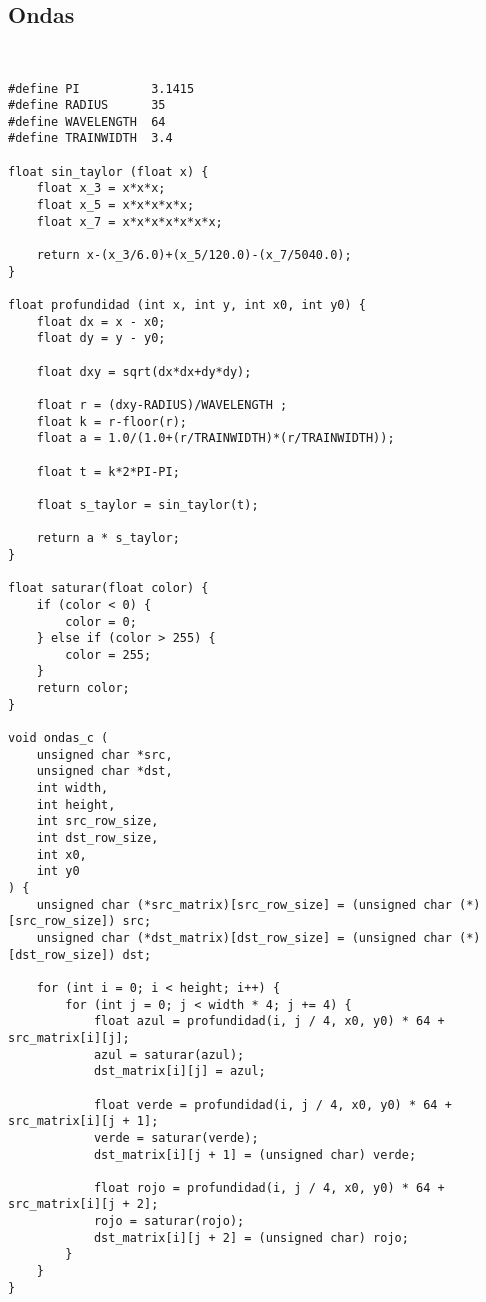 \subsection{Ondas}

\begin{codesnippet}
\begin{verbatim}


#define PI 			3.1415
#define RADIUS 		35
#define WAVELENGTH 	64
#define TRAINWIDTH 	3.4

float sin_taylor (float x) {
    float x_3 = x*x*x;
    float x_5 = x*x*x*x*x;
    float x_7 = x*x*x*x*x*x*x;

    return x-(x_3/6.0)+(x_5/120.0)-(x_7/5040.0);
}

float profundidad (int x, int y, int x0, int y0) {
    float dx = x - x0;
    float dy = y - y0;

    float dxy = sqrt(dx*dx+dy*dy);

    float r = (dxy-RADIUS)/WAVELENGTH ;
    float k = r-floor(r);
    float a = 1.0/(1.0+(r/TRAINWIDTH)*(r/TRAINWIDTH));

    float t = k*2*PI-PI;

    float s_taylor = sin_taylor(t);

    return a * s_taylor;
}

float saturar(float color) {
    if (color < 0) {
        color = 0;
    } else if (color > 255) {
        color = 255;
    }
    return color;
}

void ondas_c (
	unsigned char *src,
	unsigned char *dst,
	int width,
	int height,
	int src_row_size,
	int dst_row_size,
	int x0,
	int y0
) {
    unsigned char (*src_matrix)[src_row_size] = (unsigned char (*)[src_row_size]) src;
    unsigned char (*dst_matrix)[dst_row_size] = (unsigned char (*)[dst_row_size]) dst;

    for (int i = 0; i < height; i++) {
        for (int j = 0; j < width * 4; j += 4) {
            float azul = profundidad(i, j / 4, x0, y0) * 64 + src_matrix[i][j];
            azul = saturar(azul);
            dst_matrix[i][j] = azul;

            float verde = profundidad(i, j / 4, x0, y0) * 64 + src_matrix[i][j + 1];
            verde = saturar(verde);
            dst_matrix[i][j + 1] = (unsigned char) verde;

            float rojo = profundidad(i, j / 4, x0, y0) * 64 + src_matrix[i][j + 2];
            rojo = saturar(rojo);
            dst_matrix[i][j + 2] = (unsigned char) rojo;
        }
    }
}
\end{verbatim}
\end{codesnippet}

